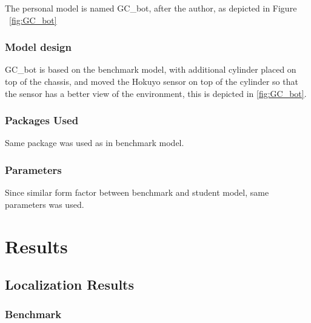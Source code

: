 \documentclass[10pt,journal,compsoc]{IEEEtran}
\begin{document}
The personal model is named GC\_bot, after the author, as depicted in Figure ~\ref{fig:GC_bot}

\subsubsection{Model design}
GC\_bot is based on the benchmark model, with additional cylinder placed on top of the chassis, and moved the Hokuyo sensor on top of the cylinder so that the sensor has a better view of the environment, this is depicted in \ref{fig:GC_bot}.

\subsubsection{Packages Used}
Same package was used as in benchmark model.
\subsubsection{Parameters}
Since similar form factor between benchmark and student model, same parameters was used.

\section{Results}

\subsection{Localization Results}
\subsubsection{Benchmark}
\end{document}
